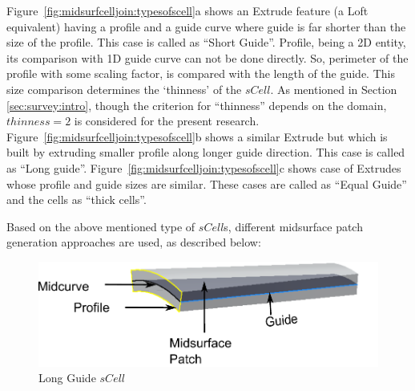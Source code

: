 Figure~\ref{fig:midsurfcelljoin:typesofscell}a shows an Extrude feature (a Loft equivalent) having a profile and a guide curve where guide is far shorter than the size of the profile. This case is called as ``Short Guide''. Profile, being a 2D entity, its comparison with 1D guide curve can not be done directly. So, perimeter of the profile with some scaling factor, is compared with the length of the guide. This size comparison determines the `thinness' of the $sCell$.  As mentioned in Section \ref{sec:survey:intro}, though the criterion for ``thinness'' depends on the domain, $thinness = 2$ is considered for the present research. Figure~\ref{fig:midsurfcelljoin:typesofscell}b shows a similar Extrude but which is built by extruding smaller profile along longer guide direction. This case is called as ``Long guide''. Figure~\ref{fig:midsurfcelljoin:typesofscell}c shows case of Extrudes whose profile and guide sizes are similar. These cases are called as ``Equal Guide'' and the cells as ``thick cells''.


Based on the above mentioned type of $sCell$s,  different midsurface patch generation approaches are used, as described below: 

\begin{figure}[h]
\centering \includegraphics[scale=0.62]{../Common/images//MidsurfSmallProfile_3.pdf} 
\caption{Long Guide $sCell$}
\label{figure_MidsurfSmallProfile_2}
\end{figure}



